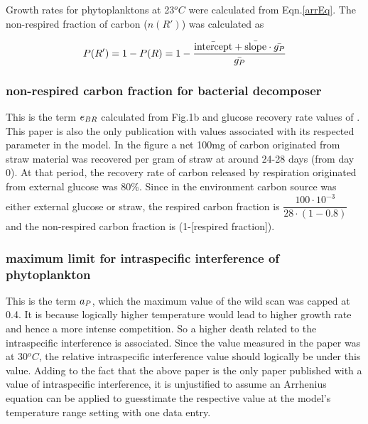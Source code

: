 \documentclass[../thesis.tex]{subfiles} %
\begin{document}
Growth rates for phytoplanktons at 23$^oC$ were calculated from Eqn.\ref{arrEq}.  The non-respired fraction of carbon ($n(R')$) was calculated as

\begin{equation}
    P(R') = 1-P(R) = 1-\dfrac{\Bar{\text{intercept}}+\Bar{\text{slope}}\cdot\Bar{g_P}}{\Bar{g_P}}
    \label{ePReqn}
\end{equation}

\subsubsection{non-respired carbon fraction for bacterial decomposer}
This is the term $e_{BR}$ calculated from Fig.1b and glucose recovery rate values of \autocite{cochran1988estimation}.  This paper is also the only publication with values associated with its respected parameter in the model.  In the figure a net 100mg of carbon originated from straw material was recovered per gram of straw at around 24-28 days (from day 0).  At that period, the recovery rate of carbon released by respiration originated from external glucose was 80\%.  Since in the environment carbon source was either external glucose or straw, the respired carbon fraction is $\dfrac{100\cdot10^{-3}}{28\cdot(1-0.8)}$ and the non-respired carbon fraction is (1-[respired fraction]).

\subsubsection{maximum limit for intraspecific interference of phytoplankton}
This is the term $a_P$, which the maximum value of the wild scan was capped at 0.4.\autocite{de2007biofixation}  It is because logically higher temperature would lead to higher growth rate and hence a more intense competition.  So a higher death related to the intraspecific interference is associated.  Since the value measured in the paper was at 30$^oC$, the relative intraspecific interference value should logically be under this value.  Adding to the fact that the above paper is the only paper published with a value of intraspecific interference, it is unjustified to assume an Arrhenius equation can be applied to guesstimate the respective value at the model's temperature range setting with one data entry.
\end{document}
